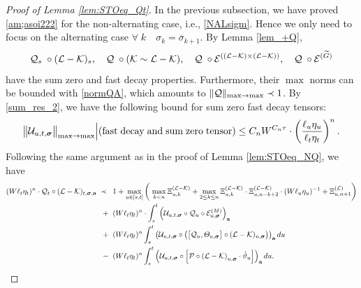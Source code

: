 \documentclass[10pt,reqno]{article}
\theoremstyle{plain} %
\theoremstyle{remark}
\numberwithin{equation}{section}
\begin{document}
\begin{proof}[Proof of Lemma \ref{lem:STOeq_Qt}]
In the previous subsection, we have proved \eqref{am;asoi222} for the non-alternating case, i.e., \eqref{NALsigm}. Hence we only need to focus on the alternating case 
$
\forall \; k \quad \sigma_k=\overline \sigma_{k+1} $.
By Lemma \ref{lem_+Q},  %
$$
{\cal Q}_s\;\circ ({\cal  L-K})_s,\quad {\cal Q}\;\circ ({\cal K\sim L-K}),\quad {\cal Q}\;\circ{\cal E}^{(({\cal L}-{\cal K})\times({\cal L}-{\cal K}))}, \quad {\cal Q}\;\circ {\cal E}^{(\widetilde G)} 
$$  
have
the sum zero and  fast decay properties. Furthermore, their $\max$ norms can be bounded with \eqref{normQA}, which amounts to  
$
\|{\cal Q}\|_{\max\to \max}\prec 1$.
By %
\eqref{sum_res_2},    we have the following bound for  sum zero fast decay tensors: 
\begin{align}\label{jsaudyfa}
    \big\|{\cal U}_{u,t,\boldsymbol{\sigma}}\big\|_{\max\to \max}\Big |({\rm fast\; decay \;and \; sum \; zero\;tensor})\le C_n W^{C_n \tau} \cdot\left(\frac{\ell_u \eta_u}{\ell_t \eta_t}\right)^n.
\end{align}
Following the same argument as in the proof of Lemma \ref{lem:STOeq_NQ}, we have 
  \begin{align}\label{sahwmis}
  (W\ell_t\eta_t)^n\cdot  {\cal Q}_t\circ   (\mathcal{L} - \mathcal{K})_{t, \boldsymbol{\sigma}, \textbf{a}} \;\prec\; \; &
  \; 1+\max_{u\in [s,t]}
  \left(\; \max_{k<n }\Xi^{({\cal L-\cal K})}_{u,k}+\max_{2\le k\le n }\Xi^{({\cal L-\cal K})}_{u,k}\cdot \Xi^{({\cal L-\cal K})}_{u,n-k+2}\cdot(W\ell_u\eta_u)^{-1}+\Xi^{({\cal L})}_{u,n+1}\right)
  \nonumber \\
 \; + \; & \;(W\ell_t\eta_t)^n\cdot\int_{s}^t \left(\mathcal{U}_{u, t, \boldsymbol{\sigma}} \circ {\cal Q}_u\circ \mathcal{E}^{(M)}_{u, \boldsymbol{\sigma}}\right)_{\textbf{a}} 
   \nonumber \\ 
     \; + \; &\; (W\ell_t\eta_t)^n\int_{s}^t 
     \left(\mathcal{U}_{u, t, \boldsymbol{\sigma}} 
     \circ \left( \big[{\cal Q}_u , \varTheta_{u,\boldsymbol{\sigma}} \big]\circ (\mathcal{L} - \mathcal{K}) _{u, \boldsymbol{\sigma} }\right) \right)_{\textbf{a}} du
        \\\nonumber
 \; - \; &\;(W\ell_t\eta_t)^n\int_{s}^t 
     \left(\mathcal{U}_{u, t, \boldsymbol{\sigma}} 
     \circ \left[ {\cal P} \circ
      \left(\mathcal{L} - \mathcal{K}\right)_{u, \boldsymbol{\sigma}}
        \cdot \dot \vartheta_{u } \right]\right)_{\textbf{a}} du.
 \end{align}


\end{proof}
\end{document}
